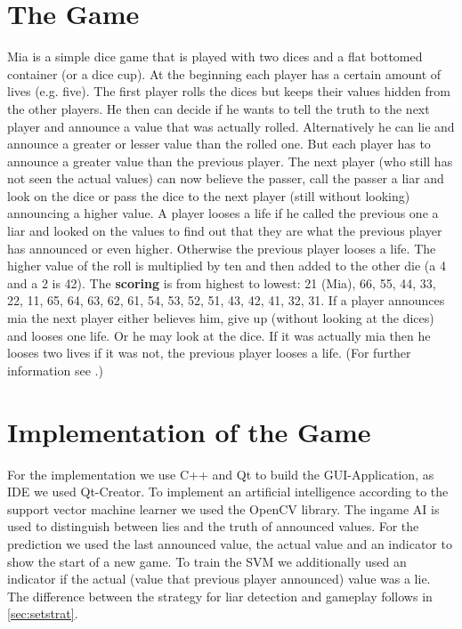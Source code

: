 \documentclass[11pt]{article}
\begin{document}
\section{The Game}
Mia is a simple dice game that is played with two dices and a flat bottomed container (or a dice cup). At the beginning each player has a certain amount of lives (e.g. five).
The first player rolls the dices but keeps their values hidden from the other players. He then can decide if he wants to tell the truth to the next player and announce a value that was actually rolled. Alternatively he can lie and announce a greater or lesser value than the rolled one.
But each player has to announce a greater value than the previous player.
The next player (who still has not seen the actual values) can now believe the passer, call the passer a liar and look on the dice or pass the dice to the next player (still without looking) announcing a higher value. 
A player looses a life if he called the previous one a liar and looked on the values to find out that they are what the previous player has announced or even higher. Otherwise the previous player looses a life. 
The higher value of the roll is multiplied by ten and then added to the other die (a 4 and a 2 is 42). 
The \textbf{scoring} is from highest to lowest:  21 (Mia), 66, 55, 44, 33, 22, 11, 65, 64, 63, 62, 61, 54, 53, 52, 51, 43, 42, 41, 32, 31.
If a player announces mia the next player either believes him, give up (without looking at the dices) and looses one life. Or he may look at the dice. If it was actually mia then he looses two lives if it was not, the previous player looses a life. (For further information see \cite{mia:2016}.)

\section{Implementation of the Game}
For the implementation we use C++ and Qt to build the GUI-Application, as IDE we used Qt-Creator. To implement an artificial intelligence according to the support vector machine learner we used the OpenCV library.
The ingame AI is used to distinguish between lies and the truth of announced values.
For the prediction we used the last announced value, the actual value and an indicator to show the start of a new game. 
To train the SVM we additionally used an indicator if the actual (value that previous player announced) value was a lie.\\
The difference between the strategy for liar detection and gameplay  follows in \cref{sec:setstrat}.
\end{document}
